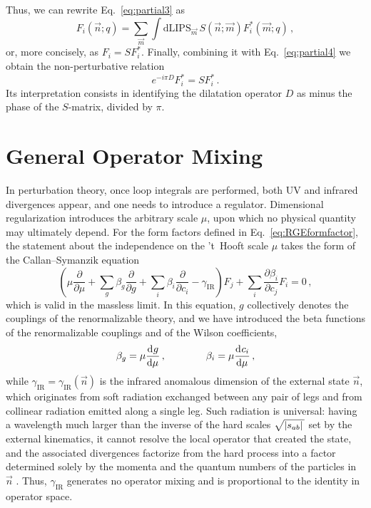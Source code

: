 Thus, we can rewrite Eq.~\eqref{eq:partial3} as
\begin{equation}
    F_i(\vec n;q) = \sum_{\vec m}\int \text{dLIPS}_{\vec m} \, S(\vec n;\vec m) F_i^*(\vec m;q)\,,
\end{equation}
or, more concisely, as $F_i = SF_i^*$. Finally, combining it with Eq.~\eqref{eq:partial4} we obtain the non-perturbative relation \cite{Caron-Huot:2016cwu}
\begin{equation}\label{eq:CHWmaster}
    e^{-i\pi D} F_i^* = S F_i^*\,.
\end{equation}
Its interpretation consists in identifying the dilatation operator $D$ as minus the phase of the $S$-matrix, divided by $\pi$.

\section{General Operator Mixing}
\label{sec:RGEmixing}

In perturbation theory, once loop integrals are performed, both UV and infrared divergences appear, and one needs to introduce a regulator.
Dimensional regularization \cite{Bollini:1972ui,tHooft:1972tcz,Ashmore:1972uj} introduces the arbitrary scale $\mu$, upon which no physical quantity may ultimately depend.
For the form factors defined in Eq.~\eqref{eq:RGEformfactor}, the statement about the independence on the 't~Hooft scale $\mu$ takes the form of the Callan--Symanzik equation \cite{Callan:1970yg,Symanzik:1970rt}
    \begin{equation}
    \label{eq:CSEq}
    \left( \mu\frac{\partial}{\partial \mu} +\sum_g\beta_g \frac{\partial}{\partial g} + \sum_i \beta_i \frac{\partial}{\partial c_i}- \gamma_{\text{IR}}\right)F_j + \sum_i \frac{\partial \beta_i}{\partial c_j} F_i =   0\,,
\end{equation}
which is valid in the massless limit. In this equation, $g$ collectively denotes the couplings of the renormalizable theory, and we have introduced the beta functions of the renormalizable couplings and of the Wilson coefficients,
\begin{equation}\label{eq:betadefs}
    \beta_g = \mu\dv[]{g}{\mu}\,, \qquad\qquad \beta_i = \mu\dv[]{c_i}{\mu}\,,
\end{equation}
while $\gamma_{\text{IR}} = \gamma_{\text{IR}}(\vec n)$ is the infrared anomalous dimension of the external state $\vec n$, which originates from soft radiation exchanged between any pair of legs and from collinear radiation emitted along a single leg.
Such radiation is universal: having a wavelength much larger than the inverse of the hard scales $\sqrt{\abs*{s_{ab}}}$ set by the external kinematics, it cannot resolve the local operator that created the state, and the associated divergences factorize from the hard process into a factor determined solely by the momenta and the quantum numbers of the particles in $\vec n$ \cite{Sterman:2002qn,Becher:2009cu}.
Thus, $\gamma_{\text{IR}}$ generates no
operator mixing and is proportional to the identity in operator space.

